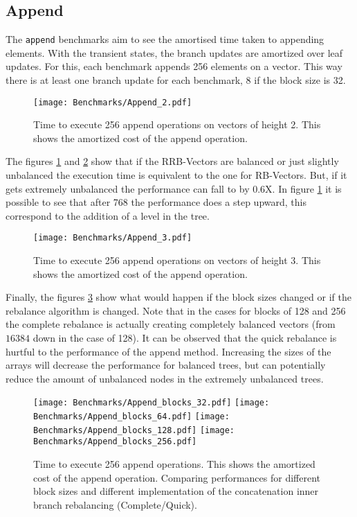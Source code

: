 \subsection{Append}
The \texttt{append} benchmarks aim to see the amortised time taken to appending elements. With the transient states, the branch updates are amortized over leaf updates. For this, each benchmark appends 256 elements on a vector. This way there is at least one branch update for each benchmark, 8 if the block size is 32.

\begin{figure}[h!]
  \centering
  \texttt{[image: Benchmarks/Append\_2.pdf]}
  \caption{Time to execute 256 append operations on vectors of height 2. This shows the amortized cost of the append operation.}
  \label{Append2Benchmarks}
\end{figure}

The figures \ref{Append2Benchmarks} and \ref{Append3Benchmarks} show that if the RRB-Vectors are balanced or just slightly unbalanced the execution time is equivalent to the one for RB-Vectors. But, if it gets extremely unbalanced the performance can fall to by 0.6X. In figure \ref{Append2Benchmarks} it is possible to see that after 768 the performance does a step upward, this correspond to the addition of a level in the tree.

\begin{figure}[h!]
  \centering
  \texttt{[image: Benchmarks/Append\_3.pdf]}
  \caption{Time to execute 256 append operations on vectors of height 3. This shows the amortized cost of the append operation.}
   \label{Append3Benchmarks}
\end{figure}

\FloatBarrier

Finally, the figures \ref{AppendBlocksBenchmarks} show what would happen if the block sizes changed or if the rebalance algorithm is changed. Note that in the cases for blocks of 128 and 256 the complete rebalance is actually creating completely balanced vectors (from $16384$ down in the case of 128). It can be observed that the quick rebalance is hurtful to the performance of the append method. Increasing the sizes of the arrays will decrease the performance for balanced trees, but can potentially reduce the amount of unbalanced nodes in the extremely unbalanced trees.

\begin{figure}[h!]
  \centering
  \texttt{[image: Benchmarks/Append\_blocks\_32.pdf]}
  \texttt{[image: Benchmarks/Append\_blocks\_64.pdf]}
  \texttt{[image: Benchmarks/Append\_blocks\_128.pdf]}
  \texttt{[image: Benchmarks/Append\_blocks\_256.pdf]}
  \caption{Time to execute 256 append operations. This shows the amortized cost of the append operation. Comparing performances for different block sizes and different implementation of the concatenation inner branch rebalancing (Complete/Quick).}
  \label{AppendBlocksBenchmarks}
\end{figure}



